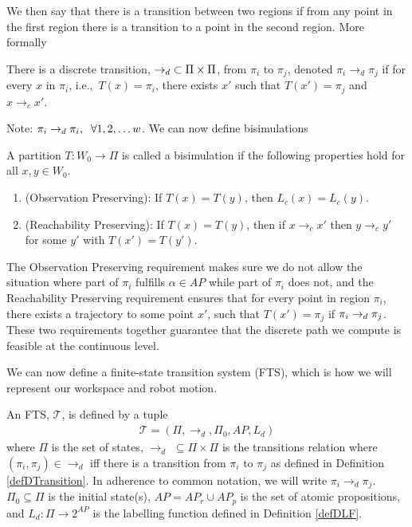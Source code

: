 We then say that there is a transition between two regions if from any point in the first region there is a transition to a point in the second region. More formally

\theoremstyle{definition}
\begin{definition}
\label{defDTransition}
There is a discrete transition, $\rightarrow_d \hspace{0.1cm} \subset \Pi \times \Pi$, from $\pi_i$ to $\pi_j$, denoted $\pi_i \rightarrow_d \pi_j$ if for every $x$ in $\pi_i$, i.e.,\ $T(x) = \pi_i$, there exists $x'$ such that $T(x')=\pi_j$ and $x \rightarrow_c x'$.
\end{definition}
Note: $\pi_i \rightarrow_d \pi_i, \hspace{0.2cm} \forall 1,2,\dots w$.
We can now define bisimulations
\theoremstyle{definition}
\begin{definition}
\label{def:bisim}
A partition $T:W_0\rightarrow \Pi$ is called a bisimulation \cite{fainekos09} if the following properties hold for all $x,y \in W_0$.
\begin{enumerate}
    \item (Observation Preserving): If $T(x)=T(y)$, then $L_c(x) = L_c(y)$.
    \item (Reachability Preserving): If $T(x) = T(y)$, then if $x\rightarrow_c x'$ then $y \rightarrow_c y'$ for some $y'$ with $T(x')=T(y')$.
\end{enumerate}
\end{definition}

The Observation Preserving requirement makes sure we do not allow the situation where part of $\pi_i$ fulfills $\alpha \in AP$ while part of $\pi_i$ does not, and the Reachability Preserving requirement ensures that for every point in region $\pi_i$, there exists a trajectory to some point $x'$, such that $T(x') = \pi_j$ if $\pi_i \nobreak \rightarrow_d \pi_j$. These two requirements together guarantee that the discrete path we compute is feasible at the continuous level.


We can now define a finite-state transition system (FTS), which is how we will represent our workspace and robot motion.
\theoremstyle{definition}
\begin{definition}
\label{defFTS}
An FTS, $\mathcal{T}$, is defined by a tuple 
\begin{align*}
\mathcal{T} = (\Pi, \rightarrow_d, \Pi_0, AP,L_d)
\end{align*}
where $\Pi$ is the set of states, $\rightarrow_d$ $ \subseteq \Pi \times \Pi$ is the transitions relation where $(\pi_i,\pi_j) \in \rightarrow_d$ iff there is a transition from $\pi_i$ to $\pi_j$ as defined in Definition \ref{defDTransition}. In adherence to common notation, we will write $\pi_i \rightarrow_d \pi_j$. $\Pi_0 \subseteq \Pi$ is the initial state(s), $AP=AP_r \cup AP_p$ is the set of atomic propositions, and $L_d: \Pi \rightarrow 2^{AP}$ is the labelling function defined in Definition \ref{defDLF}.
\end{definition}


